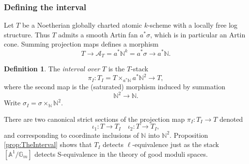 \documentclass[11pt]{amsart}
\newcommand{\MScomment}[1]{\textcolor{OliveGreen}{[MS: #1]}}
\theoremstyle{definition}
\theoremstyle{definition}
\newtheorem{definition}[theorem]{Definition}
\begin{document}


\subsubsection{Defining the interval} Let $T$ be a Noetherian globally charted atomic $k$-scheme with a locally free log structure. Thus $T$ admits a smooth Artin fan $a^\ast \sigma$, which is in particular an Artin cone.
Summing projection maps defines a morphism 
$$T\longrightarrow \mathcal{A}_T = a^\ast \mathbb{N}^k = a^\ast \sigma\longrightarrow a^\ast \mathbb{N}.$$ 
\begin{definition}
    The \textit{interval over $T$} is the $T$-stack $$\pi_I\colon T_I = T\times_{a^\ast \mathbb{N}}a^\ast \mathbb{N}^2\longrightarrow T,$$
    where the second map is the (saturated) morphism induced by summation $$\mathbb{N}^2\longrightarrow \mathbb{N}.$$ Write $\sigma_I = \sigma\times_\mathbb{N}\mathbb{N}^2$.
\end{definition} 

There are two canonical strict sections of the projection map $\pi_I\colon T_I\rightarrow T$ denoted $$\iota_1\colon T \longrightarrow T_I \quad \iota_2\colon T \longrightarrow T_I,$$ and corresponding to coordinate inclusions of $\mathbb{N}$ into $\mathbb{N}^2$. 
Proposition \ref{prop:TheInterval} shows that $T_I$ detects $\ell$-equivalence just as the stack $[\mathbb{A}^1/\mathbb{G}_m]$ detects S-equivalence in the theory of good moduli spaces.
\end{document}
